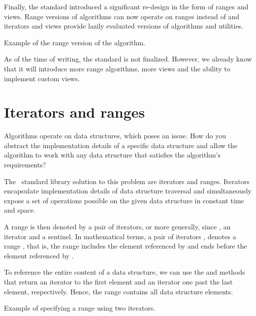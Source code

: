 Finally, the  standard introduced a significant re-design in the form of ranges and views. Range versions of algorithms can now operate on ranges instead of  and  iterators and views provide lazily evaluated versions of algorithms and utilities.

\begin{box-note}
\footnotesize Example of the range version of the  algorithm.
\tcblower
{}
\end{box-note}

As of the time of writing, the  standard is not finalized. However, we already know that it will introduce more range algorithms, more views and the ability to implement custom views.

\section{Iterators and ranges}

Algorithms operate on data structures, which poses an issue. How do you abstract the implementation details of a specific data structure and allow the algorithm to work with any data structure that satisfies the algorithm's requirements?

The \CC\, standard library solution to this problem are iterators and ranges. Iterators encapsulate implementation details of data structure traversal and simultaneously expose a set of operations possible on the given data structure in constant time and space.

A range is then denoted by a pair of iterators, or more generally, since , an iterator and a sentinel. In mathematical terms, a pair of iterators ,  denotes a range \cpp{[it1, it2)}, that is, the range includes the element referenced by  and ends before the element referenced by .

To reference the entire content of a data structure, we can use the  and  methods that return an iterator to the first element and an iterator one past the last element, respectively. Hence, the range \cpp{[begin, end)} contains all data structure elements.

\begin{box-note}
\footnotesize Example of specifying a range using two iterators.
\tcblower
{}
\end{box-note}

